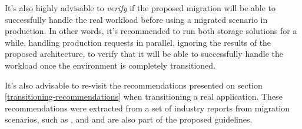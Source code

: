 It's also highly advisable to \textit{verify} if the proposed migration will be able to successfully handle the real workload before using a migrated scenario in production. In other words, it's recommended to run both storage solutions for a while, handling production requests in parallel, ignoring the results of the proposed architecture, to verify that it will be able to successfully handle the workload once the environment is completely transitioned.

It's also advisable to re-visit the recommendations presented on section \ref{transitioning-recommendations} when transitioning a real application. These recommendations were extracted from a set of industry reports from migration scenarios, such as \cite{spotifyEngineering}, \cite{coursera-mysql-cassandra} and \cite{scoutmigration} and are also part of the proposed guidelines.

